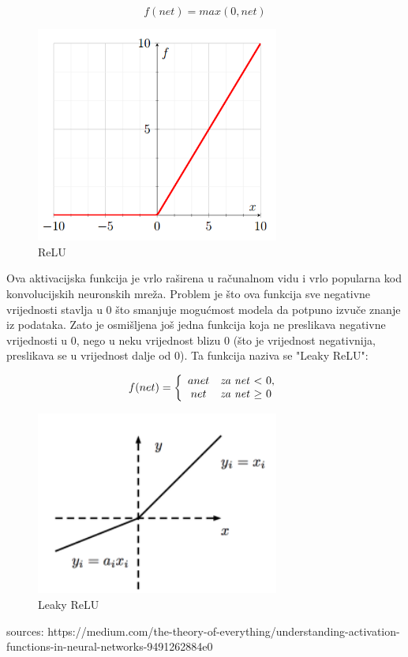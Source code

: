 \begin{equation}
f(net) = max(0, net)
\label{eq:relu}
\end{equation}

\begin{figure}[H]
\centering
\includegraphics[width=8cm]{img/ReLU.png}
\caption{ReLU}
\label{img:relu}
\end{figure}

Ova aktivacijska funkcija je vrlo raširena u računalnom vidu i vrlo popularna kod konvolucijskih neuronskih mreža. Problem je što ova funkcija sve negativne vrijednosti stavlja u $0$ što smanjuje mogućmost modela da potpuno izvuče znanje iz podataka. Zato je osmišljena još jedna funkcija koja ne preslikava negativne vrijednosti u 0, nego u neku vrijednost blizu $0$ (što je vrijednost negativnija, preslikava se u vrijednost dalje od $0$). Ta funkcija naziva se "Leaky ReLU":

\begin{equation}
f(net)=\left\{
\begin{array}{c l}	
     a {net}   & $\textit{za net} $ < $ $ 0,\\
     {net}     & $\textit{za net} $ \geq $ $ 0
\end{array}\right.
\label{eq:Leaky ReLU}
\end{equation}

\begin{figure}[H]
\centering
\includegraphics[width=8cm]{img/LeakyReLU.png}
\caption{Leaky ReLU}
\label{img:Leaky ReLU}
\end{figure}



sources: https://medium.com/the-theory-of-everything/understanding-activation-functions-in-neural-networks-9491262884e0